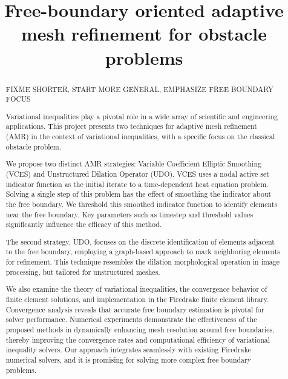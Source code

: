 \documentclass[]{interact}
\theoremstyle{plain}%
\theoremstyle{definition}
\theoremstyle{remark}
\begin{document}

\title{Free-boundary oriented adaptive mesh refinement for obstacle problems}

\author{
}

\maketitle

\begin{abstract}
FIXME SHORTER, START MORE GENERAL, EMPHASIZE FREE BOUNDARY FOCUS

Variational inequalities play a pivotal role in a wide array of scientific and engineering
applications. This project presents two techniques for adaptive mesh refinement (AMR) in the context of variational inequalities, with a specific focus on the classical obstacle problem. 

We propose two distinct AMR strategies: Variable Coefficient Elliptic Smoothing (VCES) and Unstructured Dilation Operator (UDO). VCES uses a nodal active set indicator function as the initial iterate to a time-dependent heat equation problem. Solving a single step of this problem has the effect of smoothing the indicator about the free boundary. We threshold this smoothed indicator function to identify elements near the free boundary. Key parameters such as timestep and threshold values significantly influence the efficacy of this method.

The second strategy, UDO, focuses on the discrete identification of elements adjacent to the free boundary, employing a graph-based approach to mark neighboring elements for refinement. This technique resembles the dilation morphological operation in image processing, but tailored for unstructured meshes.

We also examine the theory of variational inequalities, the convergence behavior of finite element solutions, and implementation in the Firedrake finite element library. Convergence analysis reveals that accurate free boundary estimation is pivotal for solver performance. Numerical experiments demonstrate the effectiveness of the proposed methods in dynamically enhancing mesh resolution around free boundaries, thereby improving the convergence rates and computational efficiency of variational inequality solvers. Our approach integrates seamlessly with existing Firedrake numerical solvers, and it is promising for solving more complex free boundary problems.
\end{abstract}
\end{document}
